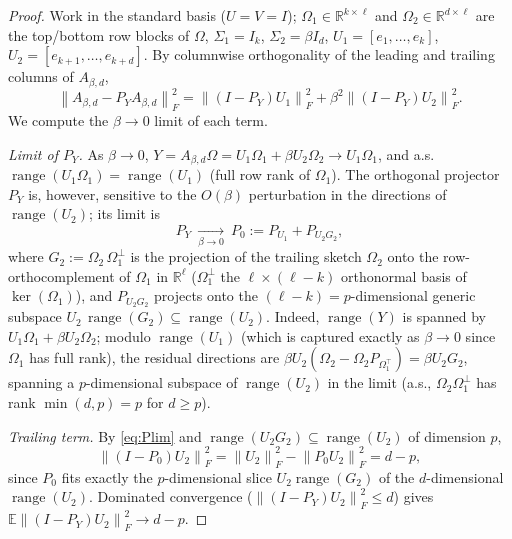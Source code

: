 \documentclass{amsart}
\theoremstyle{definition}
\DeclareMathOperator{\range}{range}
\newcommand{\R}{\mathbb{R}}
\newcommand{\Frob}[1]{\left\lVert #1\right\rVert_F}
\newcommand{\E}{\mathbb{E}}
\begin{document}
\begin{proof}
Work in the standard basis ($U=V=I$); $\Omega_1\in\R^{k\times\ell}$ and
$\Omega_2\in\R^{d\times\ell}$ are the top/bottom row blocks of $\Omega$,
$\Sigma_1=I_k$, $\Sigma_2=\beta I_d$, $U_1=[e_1,\dots,e_k]$,
$U_2=[e_{k+1},\dots,e_{k+d}]$. By columnwise orthogonality of the leading and
trailing columns of $A_{\beta,d}$,
\begin{equation}\label{eq:exactdecomp}
\Frob{A_{\beta,d}-P_YA_{\beta,d}}^2
=\Frob{(I-P_Y)U_1}^2+\beta^2\Frob{(I-P_Y)U_2}^2 .
\end{equation}
We compute the $\beta\to0$ limit of each term.

\emph{Limit of $P_Y$.} As $\beta\to0$, $Y=A_{\beta,d}\Omega=U_1\Omega_1+\beta U_2\Omega_2
\to U_1\Omega_1$, and a.s.\ $\range(U_1\Omega_1)=\range(U_1)$ (full row rank of
$\Omega_1$). The orthogonal projector $P_Y$ is, however, sensitive to the
$O(\beta)$ perturbation in the directions of $\range(U_2)$; its limit is
\begin{equation}\label{eq:Plim}
P_Y\ \xrightarrow[\beta\to0]{}\ P_0:=P_{U_1}+P_{U_2 G_2},
\end{equation}
where $G_2:=\Omega_2\,\Omega_1^\perp$ is the projection of the trailing sketch
$\Omega_2$ onto the row-orthocomplement of $\Omega_1$ in $\R^\ell$
($\Omega_1^\perp$ the $\ell\times(\ell-k)$ orthonormal basis of
$\ker(\Omega_1)$), and $P_{U_2G_2}$ projects onto the $(\ell-k)=p$-dimensional
generic subspace $U_2\,\range(G_2)\subseteq\range(U_2)$. Indeed, $\range(Y)$ is
spanned by $U_1\Omega_1+\beta U_2\Omega_2$; modulo $\range(U_1)$ (which is
captured exactly as $\beta\to0$ since $\Omega_1$ has full rank), the residual
directions are $\beta U_2(\Omega_2-\Omega_2 P_{\Omega_1^\top})=\beta U_2 G_2$,
spanning a $p$-dimensional subspace of $\range(U_2)$ in the limit (a.s.,
$\Omega_2\Omega_1^\perp$ has rank $\min(d,p)=p$ for $d\ge p$).

\emph{Trailing term.} By \eqref{eq:Plim} and $\range(U_2G_2)\subseteq\range(U_2)$
of dimension $p$,
\[
\Frob{(I-P_0)U_2}^2=\Frob{U_2}^2-\Frob{P_0U_2}^2=d-p,
\]
since $P_0$ fits exactly the $p$-dimensional slice $U_2\range(G_2)$ of the
$d$-dimensional $\range(U_2)$. Dominated convergence ($\Frob{(I-P_Y)U_2}^2\le d$)
gives $\E\Frob{(I-P_Y)U_2}^2\to d-p$.


\end{proof}
\end{document}

